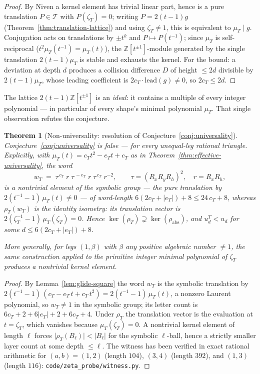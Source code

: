 \documentclass[11pt,a4paper]{article}
\newtheorem{theorem}{Theorem}
\theoremstyle{remark}
\theoremstyle{plain}
\begin{document}
\begin{proof}
By Niven a kernel element has trivial linear part, hence is a pure
translation $P \in \mathcal{T}$ with $P(\zeta_T) = 0$; writing
$P = 2(t-1) g$ (Theorem~\ref{thm:translation-lattice}) and using
$\zeta_T \neq 1$, this is equivalent to $\mu_T \mid g$.  Conjugation
acts on translations by $\pm t^k$ and $P \mapsto P(t^{-1})$; since
$\mu_T$ is self-reciprocal ($t^2 \mu_T(t^{-1}) = \mu_T(t)$), the
$\mathbb{Z}[t^{\pm 1}]$-module generated by the single translation
$2(t-1)\mu_T$ is stable and exhausts the kernel.  For the bound: a
deviation at depth $d$ produces a collision difference $D$ of height
$\le 2d$ divisible by $2(t-1)\mu_T$, whose leading coefficient is
$2 c_T \cdot \mathrm{lead}(g) \neq 0$, so $2 c_T \le 2d$.
\end{proof}

The lattice $2(t-1)\mathbb{Z}[t^{\pm 1}]$ is an \emph{ideal}: it
contains a multiple of every integer polynomial --- in particular of
every shape's minimal polynomial $\mu_T$.  That single observation
refutes the conjecture.

\begin{theorem}[Non-universality: resolution of
Conjecture~\ref{conj:universality}]
\label{thm:non-universality}
Conjecture~\ref{conj:universality} is false --- for every unequal-leg
rational triangle.  Explicitly, with $\mu_T(t) = c_T t^2 - e_T t + c_T$
as in Theorem~\ref{thm:effective-universality}, the word
\[
w_T \;=\; \tau^{\,c_T}\; r\; \tau^{\,-e_T}\; r\;
\tau^{\,c_T}\; r^{-2},
\qquad \tau = (R_x R_y R_h)^2, \quad r = R_x R_h,
\]
is a nontrivial element of the symbolic group --- the pure translation
by $2(t^{-1}-1)\,\mu_T(t) \neq 0$ --- of word-length
$6(2c_T + |e_T|) + 8 \le 24\,c_T + 8$, whereas $\rho_T(w_T)$ is the
\emph{identity} isometry: its translation vector is
$2(\zeta_T^{-1}-1)\,\mu_T(\zeta_T) = 0$.  Hence
$\ker(\rho_T) \supsetneq \ker(\rho_{\mathrm{abs}})$, and
$u_d^T < u_d$ for some $d \le 6(2c_T + |e_T|) + 8$.

More generally, for legs $(1, \beta)$ with $\beta$ any positive
algebraic number $\neq 1$, the same construction applied to the
primitive integer minimal polynomial of $\zeta_T$ produces a nontrivial
kernel element.
\end{theorem}

\begin{proof}
By Lemma~\ref{lem:glide-square} the word $w_T$ is the symbolic
translation by $2(t^{-1}-1)\,(c_T - e_T\,t + c_T\,t^2) =
2(t^{-1}-1)\,\mu_T(t)$, a nonzero Laurent polynomial, so $w_T \neq 1$
in the symbolic group; its letter count is
$6c_T + 2 + 6|e_T| + 2 + 6c_T + 4$.  Under $\rho_T$ the translation
vector is the evaluation at $t = \zeta_T$, which vanishes because
$\mu_T(\zeta_T) = 0$.  A nontrivial kernel element of length $\ell$
forces $\bigl|\rho_T(B_\ell)\bigr| < |B_\ell|$ for the symbolic
$\ell$-ball, hence a strictly smaller layer count at some depth
$\le \ell$.  The witness has been verified in exact rational
arithmetic for $(a,b) = (1,2)$ (length $104$), $(3,4)$ (length $392$),
and $(1,3)$ (length $116$): \texttt{code/zeta\_probe/witness.py}.
\end{proof}
\end{document}
